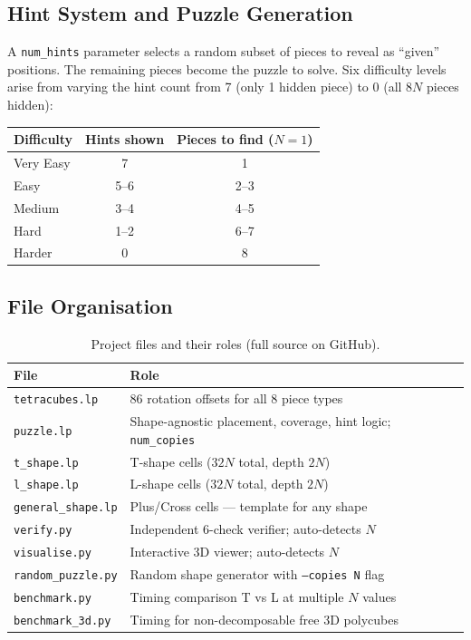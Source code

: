 \documentclass[a4paper,UKenglish,cleveref,autoref]{lipics-v2021}
\begin{document}
\subsection{Hint System and Puzzle Generation}

A \texttt{num\_hints} parameter selects a random subset of pieces to reveal
as ``given'' positions.  The remaining pieces become the puzzle to solve.
Six difficulty levels arise from varying the hint count from 7 (only 1 hidden
piece) to 0 (all $8N$ pieces hidden):

\begin{center}
\begin{tabular}{@{}lcc@{}}
  \toprule
  \textbf{Difficulty} & \textbf{Hints shown} & \textbf{Pieces to find ($N=1$)} \\
  \midrule
  Very Easy & 7   & 1 \\
  Easy      & 5--6 & 2--3 \\
  Medium    & 3--4 & 4--5 \\
  Hard      & 1--2 & 6--7 \\
  Harder    & 0   & 8 \\
  \bottomrule
\end{tabular}
\end{center}

\subsection{File Organisation}

\begin{table}[htbp]
\centering
\caption{Project files and their roles (full source on GitHub).}
\label{tab:files}
\renewcommand{\arraystretch}{1.25}
\begin{tabular}{@{}ll@{}}
  \toprule
  \textbf{File} & \textbf{Role} \\
  \midrule
  \texttt{tetracubes.lp}      & 86 rotation offsets for all 8 piece types \\
  \texttt{puzzle.lp}          & Shape-agnostic placement, coverage, hint logic; \texttt{num\_copies} \\
  \texttt{t\_shape.lp}        & T-shape cells ($32N$ total, depth $2N$) \\
  \texttt{l\_shape.lp}        & L-shape cells ($32N$ total, depth $2N$) \\
  \texttt{general\_shape.lp}  & Plus/Cross cells --- template for any shape \\
  \texttt{verify.py}          & Independent 6-check verifier; auto-detects $N$ \\
  \texttt{visualise.py}       & Interactive 3D viewer; auto-detects $N$ \\
  \texttt{random\_puzzle.py}  & Random shape generator with \texttt{--copies N} flag \\
  \texttt{benchmark.py}       & Timing comparison T vs L at multiple $N$ values \\
  \texttt{benchmark\_3d.py}   & Timing for non-decomposable free 3D polycubes \\
  \bottomrule
\end{tabular}
\end{table}
\end{document}
